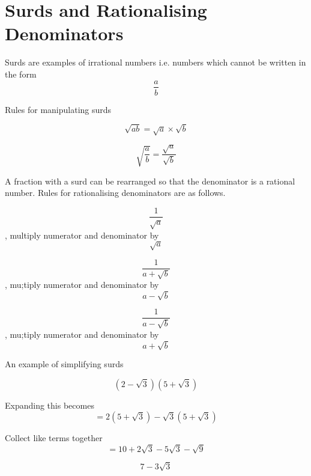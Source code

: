 \documentclass[11pt]{article}
\begin{document}
\section{Surds and Rationalising Denominators}\label{S5a}
Surds are examples of irrational numbers i.e. numbers which cannot be written in the form $$ \frac{a}{b}$$


Rules for manipulating surds
\begin{tcolorbox}[colback=green!5!white,colframe=green!75!black]
$$ \sqrt{ab}=\sqrt{a}\times\sqrt{b}  $$\newline

$$\sqrt{\frac{a}{b}}=\frac{\sqrt{a}}{\sqrt{b}}$$ \newline
\end{tcolorbox}



A fraction with a surd can be rearranged so that the denominator is a rational number. Rules for rationalising denominators are as follows. 
\begin{tcolorbox}[colback=green!5!white,colframe=green!75!black]
$$ \frac{1}{\sqrt{a}}$$, multiply numerator and denominator by $$\sqrt{a}$$ \newline

$$\frac{1}{a+\sqrt{b}}$$, mu;tiply numerator and denominator by $$  a-\sqrt{b} $$  \newline

$$\frac{1}{a-\sqrt{b}}$$, mu;tiply numerator and denominator by $$  a+\sqrt{b} $$  \newline

\end{tcolorbox}


An example of simplifying surds
\begin{tcolorbox}[colback=green!5!white,colframe=green!75!black]

$$(2-\sqrt{3})(5+\sqrt{3})$$ \newline

Expanding this becomes \newline
$$ = 2(5+\sqrt{3})-\sqrt{3}(5+\sqrt{3})   $$ \newline

Collect like terms together \newline
$$ =10+2\sqrt{3}-5\sqrt{3}-\sqrt{9}  $$

$$ 7-3\sqrt{3} $$ \newline

\end{tcolorbox}
\end{document}
